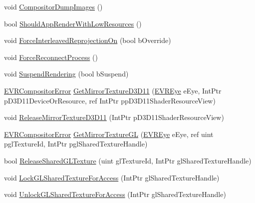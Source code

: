 \begin{DoxyCompactItemize}
\item 
void \mbox{\hyperlink{class_valve_1_1_v_r_1_1_c_v_r_compositor_ab099eb9b5f55c98faf732ba9130af86e}{Compositor\+Dump\+Images}} ()
\item 
bool \mbox{\hyperlink{class_valve_1_1_v_r_1_1_c_v_r_compositor_ae18c2535546a02e4232b221ae6e29ced}{Should\+App\+Render\+With\+Low\+Resources}} ()
\item 
void \mbox{\hyperlink{class_valve_1_1_v_r_1_1_c_v_r_compositor_aa8d3addc5e840e029af92349f4bfee99}{Force\+Interleaved\+Reprojection\+On}} (bool b\+Override)
\item 
void \mbox{\hyperlink{class_valve_1_1_v_r_1_1_c_v_r_compositor_ac898f49a56bea56a40856b0a28e2245b}{Force\+Reconnect\+Process}} ()
\item 
void \mbox{\hyperlink{class_valve_1_1_v_r_1_1_c_v_r_compositor_a1fa8f68ecca3092ff6bb5262dddb7d16}{Suspend\+Rendering}} (bool b\+Suspend)
\item 
\mbox{\hyperlink{namespace_valve_1_1_v_r_ac34ee1034fda668ccd45f57676ded81b}{E\+V\+R\+Compositor\+Error}} \mbox{\hyperlink{class_valve_1_1_v_r_1_1_c_v_r_compositor_a4f2dd54d640a7035332b10f5fb0a58ee}{Get\+Mirror\+Texture\+D3\+D11}} (\mbox{\hyperlink{namespace_valve_1_1_v_r_a8153d4a3e627e1cede046327087c1880}{E\+V\+R\+Eye}} e\+Eye, Int\+Ptr p\+D3\+D11\+Device\+Or\+Resource, ref Int\+Ptr pp\+D3\+D11\+Shader\+Resource\+View)
\item 
void \mbox{\hyperlink{class_valve_1_1_v_r_1_1_c_v_r_compositor_a68315ad4dd077f5f48917ec1ab9502d8}{Release\+Mirror\+Texture\+D3\+D11}} (Int\+Ptr p\+D3\+D11\+Shader\+Resource\+View)
\item 
\mbox{\hyperlink{namespace_valve_1_1_v_r_ac34ee1034fda668ccd45f57676ded81b}{E\+V\+R\+Compositor\+Error}} \mbox{\hyperlink{class_valve_1_1_v_r_1_1_c_v_r_compositor_a619e42191292bab5ef28e27141101888}{Get\+Mirror\+Texture\+GL}} (\mbox{\hyperlink{namespace_valve_1_1_v_r_a8153d4a3e627e1cede046327087c1880}{E\+V\+R\+Eye}} e\+Eye, ref uint pgl\+Texture\+Id, Int\+Ptr pgl\+Shared\+Texture\+Handle)
\item 
bool \mbox{\hyperlink{class_valve_1_1_v_r_1_1_c_v_r_compositor_a2f9575f73ab285f0b944b4c4757b07ba}{Release\+Shared\+G\+L\+Texture}} (uint gl\+Texture\+Id, Int\+Ptr gl\+Shared\+Texture\+Handle)
\item 
void \mbox{\hyperlink{class_valve_1_1_v_r_1_1_c_v_r_compositor_a9f44c2f5cafe863f930abc4d11da7fec}{Lock\+G\+L\+Shared\+Texture\+For\+Access}} (Int\+Ptr gl\+Shared\+Texture\+Handle)
\item 
void \mbox{\hyperlink{class_valve_1_1_v_r_1_1_c_v_r_compositor_a59a5f3ef4b8f461efb78a6050e50d07f}{Unlock\+G\+L\+Shared\+Texture\+For\+Access}} (Int\+Ptr gl\+Shared\+Texture\+Handle)

\end{DoxyCompactItemize}
